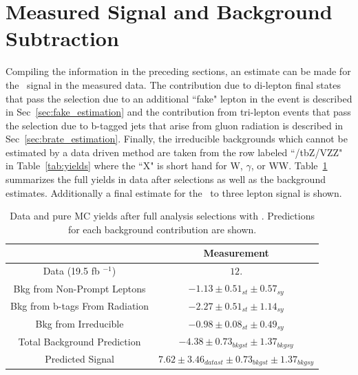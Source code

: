 	\section{Measured Signal and Background Subtraction}
	\label{sec:signal}
Compiling the information in the preceding sections, an estimate can be made for the \ttZ \ signal in the measured data. The contribution due to di-lepton final states that pass the selection due to an additional ``fake" lepton in the event is described in Sec~\ref{sec:fake_estimation} and the contribution from tri-lepton events that pass the selection due to b-tagged jets that arise from gluon radiation is described in Sec~\ref{sec:brate_estimation}. Finally, the irreducible backgrounds which cannot be estimated by a data driven method are taken from the row labeled ``\ttX/tbZ/VZZ" in Table~\ref{tab:yields} where the ``X" is short hand for W, $\gamma$, or WW. Table~\ref{tab:signal_minus_bkg} summarizes the full yields in data after selections as well as the background estimates. Additionally a final estimate for the \ttZ \ to three lepton signal is shown.

\begin{table}[ht!]
\caption{ \label{tab:signal_minus_bkg} Data and pure MC yields after full analysis selections with \intLumi. Predictions for each background contribution are shown.}
\begin{center}
\begin{tabular}{c|c}\hline
 & Measurement\\
\hline \hline
Data (19.5 fb $^{-1}$)                         & $12. $ \\
Bkg from Non-Prompt Leptons                   &  $- 1.13 \pm 0.51_{st} \pm 0.57_{sy}$ \\
Bkg from b-tags From Radiation                &  $- 2.27 \pm 0.51_{st} \pm 1.14_{sy}$ \\
Bkg from Irreducible                          &  $- 0.98 \pm 0.08_{st} \pm 0.49_{sy}$ \\
Total Background Prediction                   &  $-4.38 \pm 0.73_{bkg st} \pm 1.37_{bkg sy}$ \\
\hline
Predicted Signal                              &  $7.62 \pm 3.46_{data st} \pm 0.73_{bkg st} \pm 1.37_{bkg sy}$ \\	
\hline
\end{tabular}
\end{center}
\end{table}



